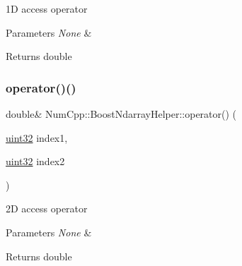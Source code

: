 1D access operator


\begin{DoxyParams}{Parameters}
{\em None} & \\
\hline
\end{DoxyParams}
\begin{DoxyReturn}{Returns}
double 
\end{DoxyReturn}
\mbox{\label{class_num_cpp_1_1_boost_ndarray_helper_a2494f3da626eb7821df4223d6db19383}} 
\subsubsection{\texorpdfstring{operator()()}{operator()()}\hspace{0.1cm}{\footnotesize\ttfamily [2/3]}}
{\footnotesize\ttfamily double\& Num\+Cpp\+::\+Boost\+Ndarray\+Helper\+::operator() (\begin{DoxyParamCaption}\item[{\mbox{\hyperlink{namespace_num_cpp_a36f388e948380413c63011cab9b7fbd5}{uint32}}}]{index1,  }\item[{\mbox{\hyperlink{namespace_num_cpp_a36f388e948380413c63011cab9b7fbd5}{uint32}}}]{index2 }\end{DoxyParamCaption})\hspace{0.3cm}{\ttfamily [inline]}}

2D access operator


\begin{DoxyParams}{Parameters}
{\em None} & \\
\hline
\end{DoxyParams}
\begin{DoxyReturn}{Returns}
double 
\end{DoxyReturn}
\mbox{\label{class_num_cpp_1_1_boost_ndarray_helper_a36d01c4c05352236735b0f9599bf9fb2}} 
